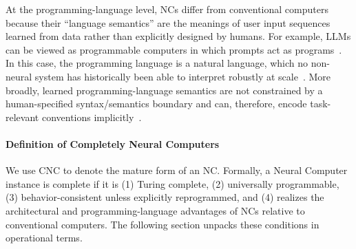 At the programming-language level, NCs differ from conventional computers because their ``language semantics'' are the meanings of user input sequences learned from data rather than explicitly designed by humans. For example, LLMs can be viewed as programmable computers in which prompts act as programs~\citep{Reynolds2021}. In this case, the programming language is a natural language, which no non-neural system has historically been able to interpret robustly at scale~\citep{jm3}. 
More broadly, learned programming-language semantics are not constrained by a human-specified syntax/semantics boundary and can, therefore, encode task-relevant conventions implicitly~\citep{wei2023chainofthoughtpromptingelicitsreasoning}.

\paragraph{Definition of Completely Neural Computers} We use CNC to denote the mature form of an NC. Formally, a Neural Computer instance is complete if it is (1) Turing complete, (2) universally programmable, (3) behavior-consistent unless explicitly reprogrammed, and (4) realizes the architectural and programming-language advantages of NCs relative to conventional computers. The following section unpacks these conditions in operational terms.

